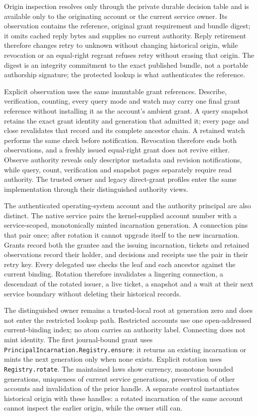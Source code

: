 \documentclass[11pt]{article}
\theoremstyle{definition}
\theoremstyle{remark}
\begin{document}
Origin inspection resolves only through the private durable decision table
and is available only to the originating account or the current service owner.
Its observation contains the reference, original grant requirement and bundle
digest; it omits cached reply bytes and supplies no current authority.  Reply
retirement therefore changes retry to unknown without changing historical
origin, while revocation or an equal-right regrant refuses retry without
erasing that origin.  The digest is an integrity commitment to the exact
published bundle, not a portable authorship signature; the protected lookup
is what authenticates the reference.

Explicit observation uses the same immutable grant references.  Describe,
verification, counting, every query mode and watch may carry one final grant
reference without installing it as the account's ambient grant.  A query
snapshot retains the exact grant identity and generation that admitted it;
every page and close revalidates that record and its complete ancestor chain.
A retained watch performs the same check before notification.  Revocation
therefore ends both observations, and a freshly issued equal-right grant does
not revive either.  Observe authority reveals only descriptor metadata and
revision notifications, while query, count, verification and snapshot pages
separately require read authority.  The trusted owner and legacy direct-grant
profiles enter the same implementation through their distinguished authority
views.

The authenticated operating-system account and the authority principal are
also distinct.  The native service pairs the kernel-supplied account number
with a service-scoped, monotonically minted incarnation generation.  A
connection pins that pair once; after rotation it cannot upgrade itself to the
new incarnation.  Grants record both the grantee and the issuing incarnation,
tickets and retained observations record their holder, and decisions and
receipts use the pair in their retry key.  Every delegated use checks the leaf
and each ancestor against the current binding.  Rotation therefore invalidates
a lingering connection, a descendant of the rotated issuer, a live ticket, a
snapshot and a wait at their next service boundary without deleting their
historical records.

The distinguished owner remains a trusted-local root at generation zero and
does not enter the restricted lookup path.  Restricted accounts use one
open-addressed current-binding index; no atom carries an authority label.
Connecting does not mint identity.  The first journal-bound grant uses
\nolinkurl{PrincipalIncarnation.Registry.ensure}: it returns an existing
incarnation or mints the next generation only when none exists.  Explicit
rotation uses \nolinkurl{Registry.rotate}.  The maintained laws show currency,
monotone bounded generations, uniqueness of current service generations,
preservation of other accounts and invalidation of the prior handle.  A
separate control instantiates historical origin with these handles: a rotated
incarnation of the same account cannot inspect the earlier origin, while the
owner still can.
\end{document}
